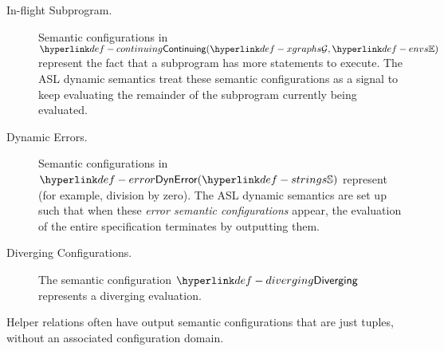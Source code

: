\begin{description}
  \hypertarget{def-continuing}{}
  \item[In-flight Subprogram.] Semantic configurations in $\Continuing(\XGraphs, \envs)$
  represent the fact that a subprogram has more statements to execute.
  The ASL dynamic semantics treat these semantic configurations as a signal to keep evaluating the remainder
  of the subprogram currently being evaluated.

  \hypertarget{def-error}{}
  \item[Dynamic Errors.] Semantic configurations in $\DynamicError(\Strings)$
  represent \dynamicerrorsterm{} (for example, division by zero).
  The ASL dynamic semantics are set up such that when these \emph{error semantic configurations} appear,
  the evaluation of the entire specification terminates by outputting them.

  \hypertarget{def-diverging}{}
  \item[Diverging Configurations.] The semantic configuration $\Diverging$
  represents a diverging evaluation.
\end{description}
Helper relations often have output semantic configurations that are just tuples, without an associated configuration domain.

